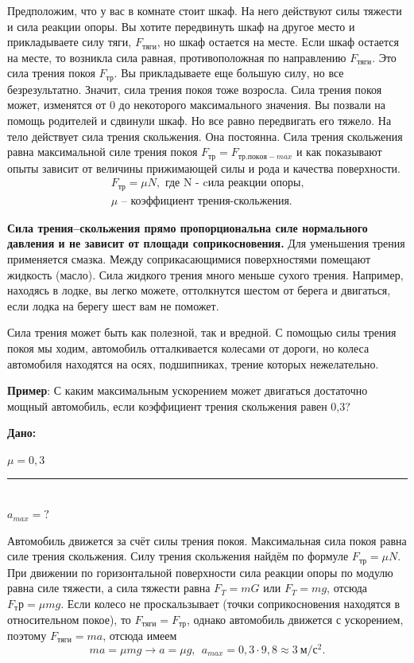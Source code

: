 \documentclass[a5paper, 10pt]{diss_4}
\renewcommand{\'}{\,'}
\begin{document}
Предположим, что у вас в комнате стоит шкаф. На него действуют силы тяжести и сила реакции опоры. Вы хотите передвинуть шкаф на другое место и прикладываете силу тяги, $F_{тяги}$, но шкаф остается на месте. Если шкаф остается на месте, то возникла сила равная, противоположная по направлению $F_{тяги}$.  Это сила трения покоя $F_{тр}$. Вы прикладываете еще большую силу, но все безрезультатно. Значит, сила трения покоя тоже возросла. Сила трения покоя может, изменятся от $0$ до некоторого максимального значения. Вы позвали на помощь родителей и сдвинули шкаф. Но все равно передвигать его тяжело. На тело действует сила трения скольжения. Она постоянна. Сила трения скольжения равна максимальной силе трения покоя $F_{тр}=F_{тр.покоя-max}$ и как показывают опыты зависит от величины прижимающей силы и рода и качества поверхности.
\begin{gather*}
F_{тр}=\mu N,\text{ где N - cила реакции опоры,}\\
\mu\text{ -- коэффициент трения-скольжения. }
\end{gather*}


\textbf{Сила трения--скольжения прямо пропорциональна силе нормального давления и не зависит от площади соприкосновения.} Для уменьшения трения применяется смазка. Между соприкасающимися поверхностями помещают жидкость (масло). Сила жидкого трения много меньше сухого трения. Например, находясь в лодке, вы легко можете, оттолкнутся шестом от берега и двигаться, если лодка на берегу шест вам не поможет.

Сила трения может быть как полезной, так и вредной. С помощью силы трения покоя мы ходим, автомобиль отталкивается колесами от дороги, но колеса автомобиля находятся на осях, подшипниках, трение которых нежелательно.

\textbf{Пример}: С каким максимальным ускорением может двигаться достаточно мощный автомобиль, если коэффициент трения скольжения равен 0,3?

\hspace{1cm}\textbf{Дано:}\hspace{.3cm}
\parbox[t]{4cm}{
$\mu= 0,3$\\
\rule{4cm}{.4pt}\\
$a_{max} = ?$\\
}


Автомобиль движется за счёт силы трения покоя.
Максимальная сила покоя равна силе трения скольжения.
Силу трения скольжения найдём по формуле $F_{тр}=\mu N$.
При движении по горизонтальной поверхности сила реакции опоры по модулю равна силе тяжести, а сила тяжести
равна $F_T=mG$ или $F_T=mg$, отсюда  $F_тр=\mu mg$. Если колесо не проскальзывает (точки соприкосновения находятся
в относительном покое), то $F_{тяги}=F_{тр}$, однако автомобиль движется с ускорением, поэтому $F_{тяги}=ma$, отсюда имеем
\[
ma=\mu mg\to a=\mu g,\ \ a_{max}=0,3\cdot9,8\approx 3\ м/с^2.
\]
\end{document}

